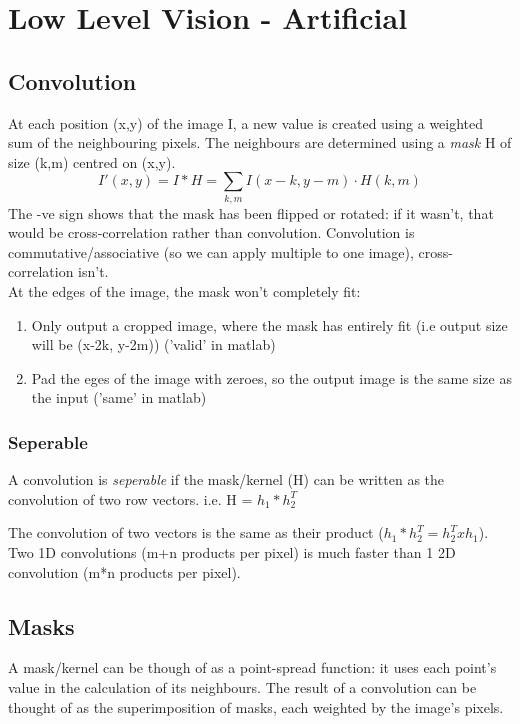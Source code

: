 \section{Low Level Vision - Artificial }

\subsection{Convolution}
At each position (x,y) of the image I, a new value is created using a weighted sum of the neighbouring pixels. The neighbours are determined using a \emph{mask} H of size (k,m) centred on (x,y).
\begin{equation}
    I'(x,y) = I\ast H = \sum_{k,m} I(x-k,y-m) \cdot H(k,m)
\end{equation}
The -ve sign shows that the mask has been flipped or rotated: if it wasn't, that would be cross-correlation rather than convolution. Convolution is commutative/associative (so we can apply multiple to one image), cross-correlation isn't. \\

At the edges of the image, the mask won't completely fit: 
\begin{enumerate}
    \item Only output a cropped image, where the mask has entirely fit (i.e output size will be (x-2k, y-2m)) ('valid' in matlab)
    \item Pad the eges of the image with zeroes, so the output image is the same size as the input ('same' in matlab)
\end{enumerate}

\subsubsection{Seperable}
A convolution is \emph{seperable} if the mask/kernel (H) can be written as the convolution of two row vectors. i.e. H = $h_1 \ast h_2^T$

The convolution of two vectors is the same as their product ($h_1 \ast h_2^T = h_2^T x h_1$). Two 1D convolutions (m+n products per pixel) is much faster than 1 2D convolution (m*n products per pixel). 

\subsection{Masks}
A mask/kernel can be though of as a point-spread function: it uses each point's value in the calculation of its neighbours. The result of a convolution can be thought of as the superimposition of masks, each weighted by the image's pixels.\\

